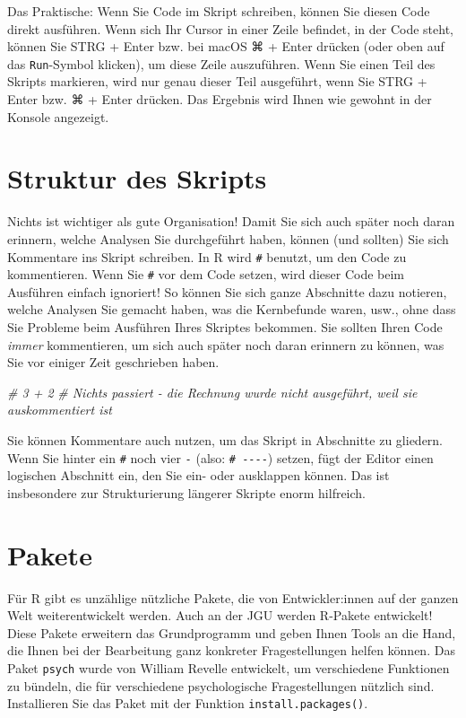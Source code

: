 \documentclass[
  ngerman,
]{book}
\newenvironment{Shaded}{\begin{snugshade}}{\end{snugshade}}
\newcommand{\CommentTok}[1]{\textcolor[rgb]{0.56,0.35,0.01}{\textit{#1}}}
\begin{document}
Das Praktische: Wenn Sie Code im Skript schreiben, können Sie diesen Code direkt ausführen. Wenn sich Ihr Cursor in einer Zeile befindet, in der Code steht, können Sie STRG + Enter bzw. bei macOS ⌘ + Enter drücken (oder oben auf das \texttt{Run}-Symbol klicken), um diese Zeile auszuführen. Wenn Sie einen Teil des Skripts markieren, wird nur genau dieser Teil ausgeführt, wenn Sie STRG + Enter bzw. ⌘ + Enter drücken. Das Ergebnis wird Ihnen wie gewohnt in der Konsole angezeigt.

\section{Struktur des Skripts}\label{struktur-des-skripts}

Nichts ist wichtiger als gute Organisation! Damit Sie sich auch später noch daran erinnern, welche Analysen Sie durchgeführt haben, können (und sollten) Sie sich Kommentare ins Skript schreiben. In R wird \texttt{\#} benutzt, um den Code zu kommentieren. Wenn Sie \texttt{\#} vor dem Code setzen, wird dieser Code beim Ausführen einfach ignoriert! So können Sie sich ganze Abschnitte dazu notieren, welche Analysen Sie gemacht haben, was die Kernbefunde waren, usw., ohne dass Sie Probleme beim Ausführen Ihres Skriptes bekommen. Sie sollten Ihren Code \emph{immer} kommentieren, um sich auch später noch daran erinnern zu können, was Sie vor einiger Zeit geschrieben haben.

\begin{Shaded}
\begin{Highlighting}[]
\CommentTok{\# 3 + 2}
\CommentTok{\# Nichts passiert {-} die Rechnung wurde nicht ausgeführt, weil sie auskommentiert ist}
\end{Highlighting}
\end{Shaded}

Sie können Kommentare auch nutzen, um das Skript in Abschnitte zu gliedern. Wenn Sie hinter ein \texttt{\#} noch vier \texttt{-} (also: \texttt{\#\ -\/-\/-\/-}) setzen, fügt der Editor einen logischen Abschnitt ein, den Sie ein- oder ausklappen können. Das ist insbesondere zur Strukturierung längerer Skripte enorm hilfreich.

\section{Pakete}\label{pakete}

Für R gibt es unzählige nützliche Pakete, die von Entwickler:innen auf der ganzen Welt weiterentwickelt werden. Auch an der JGU werden R-Pakete entwickelt! Diese Pakete erweitern das Grundprogramm und geben Ihnen Tools an die Hand, die Ihnen bei der Bearbeitung ganz konkreter Fragestellungen helfen können. Das Paket \texttt{psych} wurde von William Revelle entwickelt, um verschiedene Funktionen zu bündeln, die für verschiedene psychologische Fragestellungen nützlich sind. Installieren Sie das Paket mit der Funktion \texttt{install.packages()}.
\end{document}
